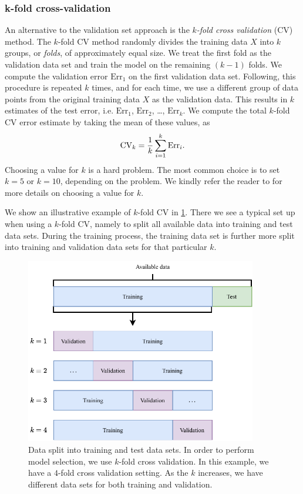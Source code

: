 \subsubsection{k-fold cross-validation}
\label{sec:cross-validation}
An alternative to the validation set approach is the \textit{$k$-fold cross validation} (CV) method. The $k$-fold CV method randomly divides the training data $X$ into $k$ groups, or \textit{folds}, of approximately equal size. We treat the first fold as the validation data set and train the model on the remaining $(k - 1)$ folds. We compute the validation error $\text{Err}_1$ on the first validation data set. Following, this procedure is repeated $k$ times, and for each time, we use a different group of data points from the original training data $X$ as the validation data. This results in $k$ estimates of the test error, i.e. $\text{Err}_1$, $\text{Err}_2$, \ldots, $\text{Err}_k$. We compute the total $k$-fold CV error estimate by taking the mean of these values, as
\begin{align}
    \text{CV}_k = \frac{1}{k} \sum\limits_{i=1}^{k} \text{Err}_i.
\end{align}
Choosing a value for $k$ is a hard problem. The most common choice is to set $k=5$ or $k=10$, depending on the problem. We kindly refer the reader to \cite[Section 5.1.4]{James2013} for more details on choosing a value for $k$.

We show an illustrative example of $k$-fold CV in \cref{fig:k-fold-cv}. There we see a typical set up when using a $k$-fold CV, namely to split all available data into training and test data sets. During the training process, the training data set is further more split into training and validation data sets for that particular $k$.
\begin{figure}[H]
    \centering
    \includegraphics[width=0.9\textwidth]{thesis/figures/k-fold-cv_cropped.pdf}
    \caption{Data split into training and test data sets. In order to perform model selection, we use $k$-fold cross validation. In this example, we have a $4$-fold cross validation setting. As the $k$ increases, we have different data sets for both training and validation.}
    \label{fig:k-fold-cv}
\end{figure}

